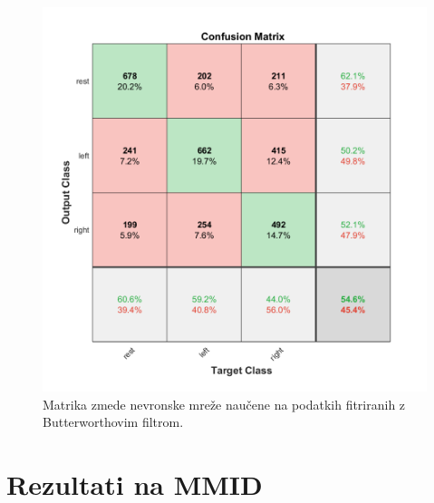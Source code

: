     \begin{figure}[h!]
    \begin{center}
    \includegraphics[width=0.5\linewidth]{slike/Confusion_my.png}
    \end{center}
    \caption{Matrika zmede nevronske mreže naučene na podatkih fitriranih z Butterworthovim filtrom.}
    \end{figure}


\newpage
\section{Rezultati na MMID}
